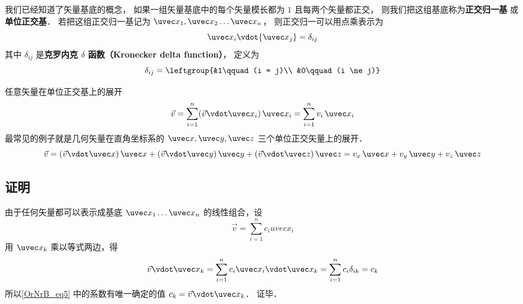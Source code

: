 

我们已经知道了矢量基底的概念， 如果一组矢量基底中的每个矢量模长都为 $1$ 且每两个矢量都正交， 则我们把这组基底称为\textbf{正交归一基} 或\textbf{单位正交基}． 若把这组正交归一基记为 $\uvec x_1,\uvec x_2\dots\uvec x_n$， 则正交归一可以用点乘表示为
\begin{equation}
{\uvec x_i}\vdot{\uvec x_j} = {\delta _{ij}}
\end{equation}
其中 $\delta_{ij}$ 是\textbf{克罗内克 $\delta$ 函数（Kronecker delta function）}， 定义为
\begin{equation}\label{OrNrB_eq2}
\delta_{ij} = \leftgroup{&1\qquad (i = j)\\ &0\qquad (i \ne j)}
\end{equation}

任意矢量在单位正交基上的展开
 \begin{equation}
\vec v = \sum_{i = 1}^n (\vec v\vdot\uvec x_i)\,\uvec x_i = \sum_{i = 1}^n v_i \,\uvec x_i
\end{equation}
最常见的例子就是几何矢量在直角坐标系的 $\uvec x, \uvec y, \uvec z$ 三个单位正交矢量上的展开．
 \begin{equation}
\vec v = (\vec v \vdot \uvec x)\,\uvec x + (\vec v \vdot \uvec y)\,\uvec y + (\vec v \vdot \uvec z)\,\uvec z = v_x \,\uvec x + v_y \,\uvec y + v_z \,\uvec z
\end{equation} 

\subsection{证明}
由于任何矢量都可以表示成基底 ${\uvec x_1}\dots{\uvec x_n}$ 的线性组合，设
\begin{equation}\label{OrNrB_eq5}
\vec v = \sum_{i = 1}^n c_i uvec x_i
\end{equation} 
用 ${\uvec x_k}$ 乘以等式两边，得
\begin{equation}
\vec v{\vdot\uvec x_k} = \sum_{i = 1}^n  c_i \uvec x_i \vdot\uvec x_k = \sum_{i = 1}^n c_i \delta_{ik}  = c_k
\end{equation}
所以\autoref{OrNrB_eq5} 中的系数有唯一确定的值 $c_k = \vec v \vdot\uvec x_k$． 证毕．






